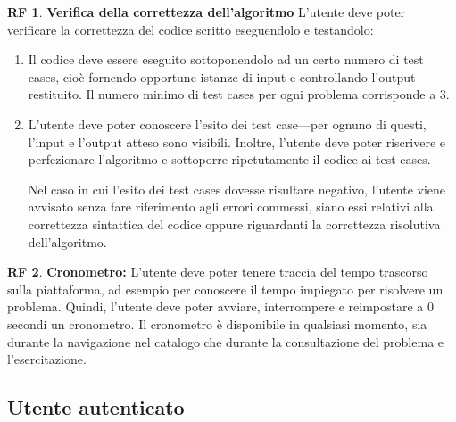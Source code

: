 \documentclass[11pt, a4paper]{article}
\theoremstyle{definition}
\newtheorem{funcreq}{RF} %
\begin{document}
\begin{funcreq}
\label{test}
\textbf{Verifica della correttezza dell'algoritmo }
L'utente deve poter verificare la correttezza del codice scritto eseguendolo
e testandolo:
\begin{enumerate}
    \item Il codice deve essere eseguito sottoponendolo ad un certo numero
    di test cases, cioè fornendo opportune istanze di input e controllando
    l'output restituito. Il numero minimo di test cases per ogni problema
    corrisponde a 3.

    \item L'utente deve poter conoscere l'esito dei test case—per ognuno
    di questi, l'input e l'output atteso sono visibili. Inoltre, l'utente
    deve poter riscrivere e perfezionare l'algoritmo e sottoporre ripetutamente
    il codice ai test cases.

    Nel caso in cui l'esito dei test cases dovesse risultare negativo, l'utente
    viene avvisato senza fare riferimento agli errori commessi, siano essi
    relativi alla correttezza sintattica del codice oppure riguardanti la
    correttezza risolutiva dell'algoritmo.
\end{enumerate}
\end{funcreq}

\begin{funcreq}
    \textbf{Cronometro: }
    L'utente deve poter tenere traccia del tempo trascorso sulla piattaforma,
    ad esempio per conoscere il tempo impiegato per risolvere un problema.
    Quindi, l'utente deve poter avviare, interrompere e reimpostare a 0 secondi un
    cronometro. Il cronometro è disponibile in qualsiasi momento, sia durante
    la navigazione nel catalogo che durante la consultazione del problema
    e l'esercitazione.
\end{funcreq}

\newpage
\begin{center}
    \section*{Utente autenticato}
\end{center}
\end{document}
